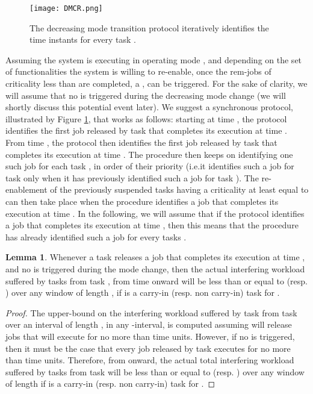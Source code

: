 \documentclass[10pt, conference, compsocconf, final]{IEEEtran}
\theoremstyle{definition}
\newtheorem{lemma}{Lemma}
\begin{document}
{\begin{figure}
	\centering
	\texttt{[image: DMCR.png]}
	\caption{The decreasing mode transition protocol iteratively identifies the time instants  for every task .}\label{figure:dmcr}
\end{figure}
Assuming the system is executing in operating mode , and depending on the set of functionalities the system is willing to re-enable, once the rem-jobs of criticality less than  are completed, a ,  can be triggered. For the sake of clarity, we will assume that no  is triggered during the decreasing mode change (we will shortly discuss this potential event later). We suggest a synchronous protocol, illustrated by Figure \ref{figure:dmcr}, that works as follows: starting at time , the protocol identifies the first job  released by task  that completes its execution at time . From time , the protocol then identifies the first job  released by task  that completes its execution at time . The procedure then keeps on identifying one such job for each task , in order of their priority (i.e.\@ it identifies such a job for task  only when it has previously identified such a job for task ). The re-enablement of the previously suspended tasks having a criticality at least equal to  can then take place when the procedure identifies a job  that completes its execution at time . In the following, we will assume that if the protocol identifies a job  that completes its execution at time , then this means that the procedure has already identified such a job for every tasks .

\begin{lemma}\label{lemma:decreasing:interferingworkload}
Whenever a task  releases a job  that completes its execution at time , and no  is triggered during the mode change, then the actual interfering workload suffered by tasks  from task , from time  onward will be less than or equal to  (resp. ) over any window of length , if  is a carry-in (resp. non carry-in) task for .
\end{lemma}
\begin{proof}
The upper-bound on the interfering workload suffered by task  from task  over an interval of length , in any -interval, is computed assuming  will release jobs that will execute for no more than  time units. However, if no  is triggered, then it must be the case that every job released by task  executes for no more than  time units. Therefore, from  onward, the actual total interfering workload suffered by tasks  from task  will be less than or equal to  (resp. ) over any window of length  if  is a carry-in (resp. non carry-in) task for .
\end{proof}

}
\end{document}
